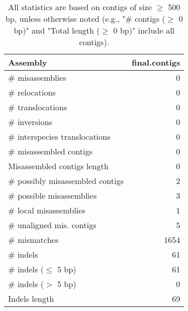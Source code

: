 \documentclass[12pt,a4paper]{article}
\begin{document}
\begin{table}[ht]
\begin{center}
\caption{All statistics are based on contigs of size $\geq$ 500 bp, unless otherwise noted (e.g., "\# contigs ($\geq$ 0 bp)" and "Total length ($\geq$ 0 bp)" include all contigs).}
\begin{tabular}{|l*{1}{|r}|}
\hline
Assembly & final.contigs \\ \hline
\# misassemblies & 0 \\ \hline
\hspace{5mm}\# relocations & 0 \\ \hline
\hspace{5mm}\# translocations & 0 \\ \hline
\hspace{5mm}\# inversions & 0 \\ \hline
\hspace{5mm}\# interspecies translocations & 0 \\ \hline
\# misassembled contigs & 0 \\ \hline
Misassembled contigs length & 0 \\ \hline
\# possibly misassembled contigs & 2 \\ \hline
\hspace{5mm}\# possible misassemblies & 3 \\ \hline
\# local misassemblies & 1 \\ \hline
\# unaligned mis. contigs & 5 \\ \hline
\# mismatches & 1654 \\ \hline
\# indels & 61 \\ \hline
\hspace{5mm}\# indels ($\leq$ 5 bp) & 61 \\ \hline
\hspace{5mm}\# indels ($>$ 5 bp) & 0 \\ \hline
Indels length & 69 \\ \hline
\end{tabular}
\end{center}
\end{table}
\end{document}

